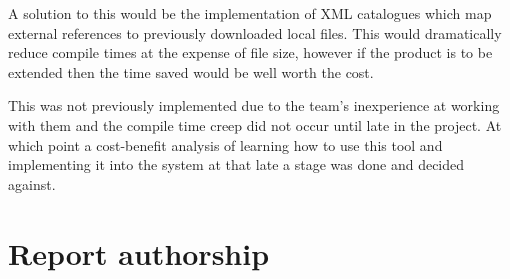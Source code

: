 \documentclass[a4paper, 12pt, twoside]{article}
\begin{document}
A solution to this would be the implementation of XML catalogues which map external references to previously downloaded local files. This would dramatically reduce compile times at the expense of file size, however if the product is to be extended then the time saved would be well worth the cost.

This was not previously implemented due to the team's inexperience at working with them and the compile time creep did not occur until late in the project. At which point a cost-benefit analysis of learning how to use this tool and implementing it into the system at that late a stage was done and decided against.

\newpage

\sloppy
\printbibliography

\appendix

\section{Report authorship}
\end{document}
